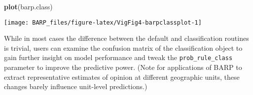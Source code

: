 \documentclass[]{article}
\newenvironment{Shaded}{\begin{snugshade}}{\end{snugshade}}
\newcommand{\KeywordTok}[1]{\textcolor[rgb]{0.13,0.29,0.53}{\textbf{#1}}}
\newcommand{\DataTypeTok}[1]{\textcolor[rgb]{0.13,0.29,0.53}{#1}}
\newcommand{\DecValTok}[1]{\textcolor[rgb]{0.00,0.00,0.81}{#1}}
\newcommand{\StringTok}[1]{\textcolor[rgb]{0.31,0.60,0.02}{#1}}
\newcommand{\OperatorTok}[1]{\textcolor[rgb]{0.81,0.36,0.00}{\textbf{#1}}}
\newcommand{\NormalTok}[1]{#1}
\begin{document}
\begin{Shaded}
\end{Shaded}

\begin{Shaded}
\begin{Highlighting}[]
\KeywordTok{plot}\NormalTok{(barp.class)}
\end{Highlighting}
\end{Shaded}

\begin{center}\texttt{[image: BARP\_files/figure-latex/VigFig4-barpclassplot-1]} \end{center}

While in most cases the difference between the default and
classification routines is trivial, users can examine the confusion
matrix of the classification object to gain further insight on model
performance and tweak the \texttt{prob\_rule\_class} parameter to
improve the predictive power. (Note for applications of BARP to extract
representative estimates of opinion at different geographic units, these
changes barely influence unit-level predictions.)

\begin{Shaded}
\end{Shaded}
\end{document}
